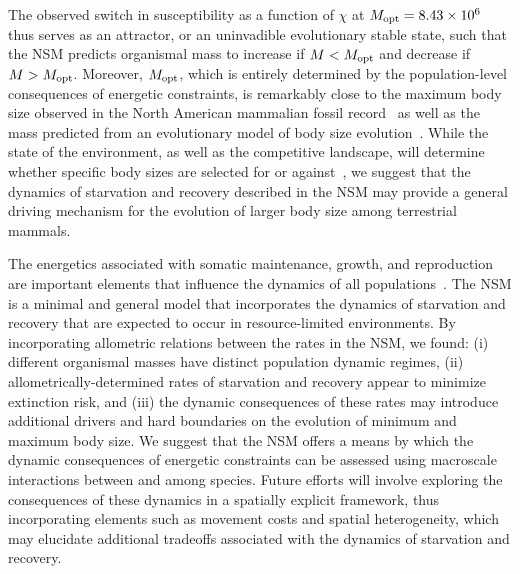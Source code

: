 \documentclass{pnastwo}
\begin{document}
\begin{article}
The observed switch in susceptibility as a function of $\chi$ at $M_{\rm opt}=8.43 \times 10^6$ thus serves as an attractor, or an uninvadible evolutionary stable state, such that the NSM predicts organismal mass to increase if $M<M_{\rm opt}$ and decrease if $M>M_{\rm opt}$.
Moreover, $M_{\rm opt}$, which is entirely determined by the population-level consequences of energetic constraints, is remarkably close to the maximum body size observed in the North American mammalian fossil record~\cite{Alroy:1998p1594} as well as the mass predicted from an evolutionary model of body size evolution~\cite{Clauset:2009fh}.
While the state of the environment, as well as the competitive landscape, will determine whether specific body sizes are selected for or against~\cite{Saarinen:2014br}, we suggest that the dynamics of starvation and recovery described in the NSM may provide a general driving mechanism for the evolution of larger body size among terrestrial mammals.



The energetics associated with somatic maintenance, growth, and reproduction are important elements that influence the dynamics of all populations~\cite{Stearns:1989ip}.  
The NSM is a minimal and general model that incorporates the dynamics of starvation and recovery that are expected to occur in resource-limited environments.  
By incorporating allometric relations between the rates in the NSM, we found: (i) different organismal masses have distinct population dynamic regimes, (ii) allometrically-determined rates of starvation and recovery appear to minimize extinction risk, and (iii) the dynamic consequences of these rates may introduce additional drivers and hard boundaries on the evolution of minimum and maximum body size.  
We suggest that the NSM offers a means by which the dynamic consequences of energetic constraints can be assessed using macroscale interactions between and among species.  
Future efforts will involve exploring the consequences of these dynamics in a spatially explicit framework, thus incorporating elements such as movement costs and spatial heterogeneity, which may elucidate additional tradeoffs associated with the dynamics of starvation and recovery.


\end{article}
\end{document}
